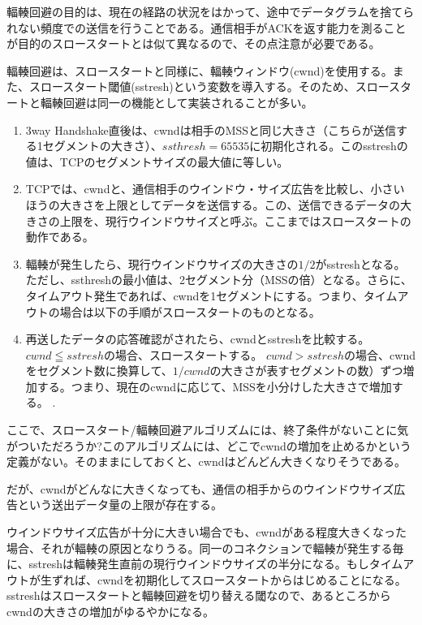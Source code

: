 輻輳回避の目的は、現在の経路の状況をはかって、途中でデータグラムを捨てられない頻度での送信を行うことである。通信相手がACKを返す能力を測ることが目的のスロースタートとは似て異なるので、その点注意が必要である。

輻輳回避は、スロースタートと同様に、輻輳ウィンドウ(cwnd)を使用する。また、スロースタート閾値(sstresh)という変数を導入する。そのため、スロースタートと輻輳回避は同一の機能として実装されることが多い。

\begin{enumerate}
\item  3way Handshake直後は、cwndは相手のMSSと同じ大きさ（こちらが送信する1セグメントの大きさ）、$ssthresh=65535$に初期化される。このsstreshの値は、TCPのセグメントサイズの最大値に等しい。
\item TCPでは、cwndと、通信相手のウインドウ・サイズ広告を比較し、小さいほうの大きさを上限としてデータを送信する。この、送信できるデータの大きさの上限を、現行ウインドウサイズと呼ぶ。ここまではスロースタートの動作である。
\item 輻輳が発生したら、現行ウインドウサイズの大きさの$1/2$がsstreshとなる。ただし、ssthreshの最小値は、2セグメント分（MSSの倍）となる。さらに、タイムアウト発生であれば、cwndを1セグメントにする。つまり、タイムアウトの場合は以下の手順がスロースタートのものとなる。
\item  再送したデータの応答確認がされたら、cwndとsstreshを比較する。
           $cwnd≦sstresh$の場合、スロースタートする。
$cwnd>sstresh$の場合、cwndをセグメント数に換算して、$1/cwnd$の大きさが表すセグメントの数）ずつ増加する。つまり、現在のcwndに応じて、MSSを小分けした大きさで増加する。
.
\end{enumerate}

ここで、スロースタート/輻輳回避アルゴリズムには、終了条件がないことに気がついただろうか?このアルゴリズムには、どこでcwndの増加を止めるかという定義がない。そのままにしておくと、cwndはどんどん大きくなりそうである。

だが、cwndがどんなに大きくなっても、通信の相手からのウインドウサイズ広告という送出データ量の上限が存在する。

ウインドウサイズ広告が十分に大きい場合でも、cwndがある程度大きくなった場合、それが輻輳の原因となりうる。同一のコネクションで輻輳が発生する毎に、sstreshは輻輳発生直前の現行ウインドウサイズの半分になる。もしタイムアウトが生ずれば、cwndを初期化してスロースタートからはじめることになる。sstreshはスロースタートと輻輳回避を切り替える閾なので、あるところからcwndの大きさの増加がゆるやかになる。

